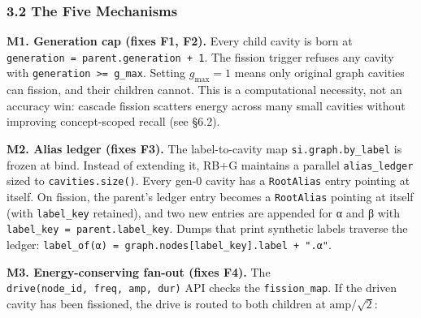 \documentclass[
  11pt,
  a4paper,
]{article}
\begin{document}
\subsubsection{3.2 The Five Mechanisms}\label{the-five-mechanisms}

\textbf{M1. Generation cap (fixes F1, F2).} Every child cavity is born
at \texttt{generation\ =\ parent.generation\ +\ 1}. The fission trigger
refuses any cavity with \texttt{generation\ \textgreater{}=\ g\_max}.
Setting \(g_\text{max} = 1\) means only original graph cavities can
fission, and their children cannot. This is a computational necessity,
not an accuracy win: cascade fission scatters energy across many small
cavities without improving concept-scoped recall (see §6.2).

\textbf{M2. Alias ledger (fixes F3).} The label-to-cavity map
\texttt{si.graph.by\_label} is frozen at bind. Instead of extending it,
RB+G maintains a parallel \texttt{alias\_ledger} sized to
\texttt{cavities.size()}. Every gen-0 cavity has a \texttt{RootAlias}
entry pointing at itself. On fission, the parent's ledger entry becomes
a \texttt{RootAlias} pointing at itself (with \texttt{label\_key}
retained), and two new entries are appended for α and β with
\texttt{label\_key\ =\ parent.label\_key}. Dumps that print synthetic
labels traverse the ledger:
\texttt{label\_of(α)\ =\ graph.nodes{[}label\_key{]}.label\ +\ ".α"}.

\textbf{M3. Energy-conserving fan-out (fixes F4).} The
\texttt{drive(node\_id,\ freq,\ amp,\ dur)} API checks the
\texttt{fission\_map}. If the driven cavity has been fissioned, the
drive is routed to both children at \(\text{amp} / \sqrt{2}\):
\end{document}
